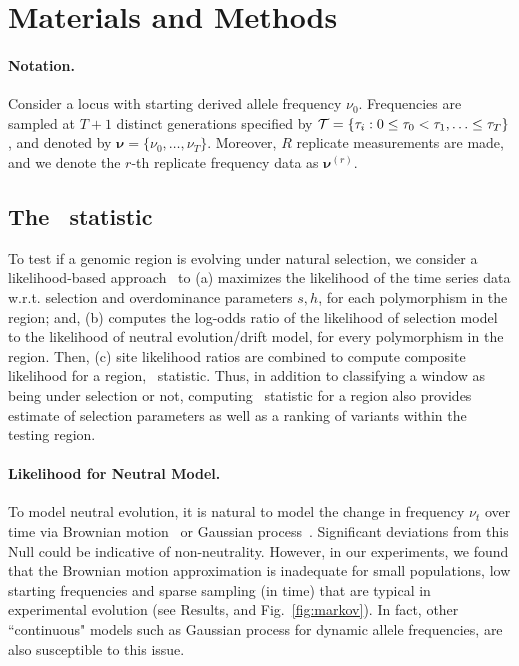 \section{Materials and Methods}
\label{sec:method}
\paragraph{Notation.} 
Consider a locus with starting derived allele frequency
$\nu_0$. Frequencies are sampled at $T+1$ distinct generations specified
by ${\cal T}= \{\tau_i: 0\le \tau_0<\tau_1,\ldots\le \tau_T\}$, and
denoted by $\bm{\nu}=\{\nu_0,\ldots,\nu_T\}$. Moreover, $R$ replicate
measurements are made, and we denote the $r$-th replicate frequency
data as $\bm{\nu}^{(r)}$.

\subsection{The \comale\  statistic}
To test if a genomic region is evolving under natural selection, we
consider a likelihood-based 
approach~\cite{vitti2013detecting,nielsen2005genomic,Terhorst2015Multi} to 
 (a) maximizes the likelihood of the time series data
w.r.t. selection and overdominance parameters $s,h$, for each polymorphism in 
the region; and, 
(b) computes
the log-odds ratio of the likelihood of selection model to the
likelihood of neutral evolution/drift model, for every polymorphism in 
the region. 
Then, (c) site likelihood ratios are combined to compute composite likelihood 
for a region, \comale\ statistic. 
Thus, in addition to classifying a window as being under selection or not, 
computing \comale\ statistic for a region also provides estimate of 
selection parameters as well as a ranking of variants within the testing 
region. 

\paragraph{Likelihood for Neutral Model.}
To model neutral evolution, it is natural to model the change in
frequency $\nu_t$ over time via Brownian
motion~\cite{feder2014Identifying} or Gaussian
process~\cite{Terhorst2015Multi}. Significant deviations from this
Null could be indicative of non-neutrality. However, in our
experiments, we found that the Brownian motion approximation is
inadequate for small populations, low starting frequencies and sparse sampling 
(in time)
that are typical in experimental evolution (see Results, and
Fig.~\ref{fig:markov}). In fact, other ``continuous" models such as
Gaussian process for dynamic allele frequencies, are also susceptible to this
issue.

